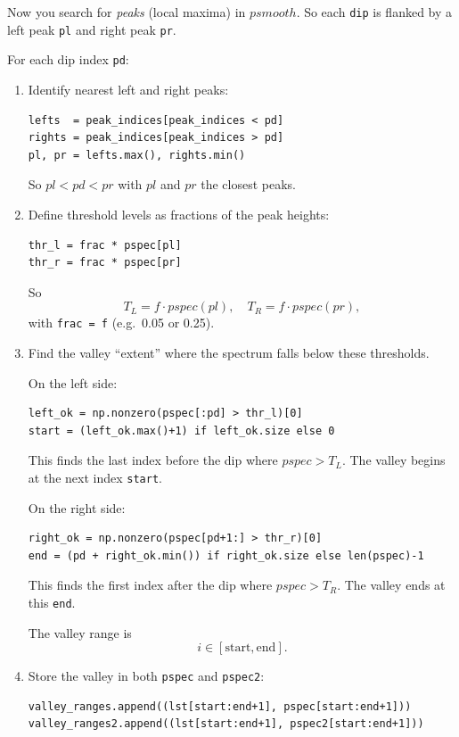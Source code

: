 \documentclass[11pt]{article}
\begin{document}
Now you search for \emph{peaks} (local maxima) in $psmooth$. So each \texttt{dip} is flanked by a left peak \texttt{pl} and right peak \texttt{pr}.

For each dip index \texttt{pd}:

\begin{enumerate}[leftmargin=*]
  \item Identify nearest left and right peaks:
\begin{verbatim}
lefts  = peak_indices[peak_indices < pd]
rights = peak_indices[peak_indices > pd]
pl, pr = lefts.max(), rights.min()
\end{verbatim}

So $pl < pd < pr$ with $pl$ and $pr$ the closest peaks.

  \item Define threshold levels as fractions of the peak heights:
\begin{verbatim}
thr_l = frac * pspec[pl]
thr_r = frac * pspec[pr]
\end{verbatim}
So
\[
  T_L = f \cdot pspec(pl), \quad T_R = f \cdot pspec(pr),
\]
with \texttt{frac = f} (e.g.\ 0.05 or 0.25).

  \item Find the valley ``extent'' where the spectrum falls below these thresholds.
  
  On the left side:
\begin{verbatim}
left_ok = np.nonzero(pspec[:pd] > thr_l)[0]
start = (left_ok.max()+1) if left_ok.size else 0
\end{verbatim}
This finds the last index before the dip where $pspec > T_L$. The valley begins at the next index \texttt{start}.

  On the right side:
\begin{verbatim}
right_ok = np.nonzero(pspec[pd+1:] > thr_r)[0]
end = (pd + right_ok.min()) if right_ok.size else len(pspec)-1
\end{verbatim}
This finds the first index after the dip where $pspec > T_R$. The valley ends at this \texttt{end}.

The valley range is
\[
  i \in [\mathrm{start}, \mathrm{end}].
\]

  \item Store the valley in both \texttt{pspec} and \texttt{pspec2}:
\begin{verbatim}
valley_ranges.append((lst[start:end+1], pspec[start:end+1]))
valley_ranges2.append((lst[start:end+1], pspec2[start:end+1]))
\end{verbatim}
\end{enumerate}
\end{document}
